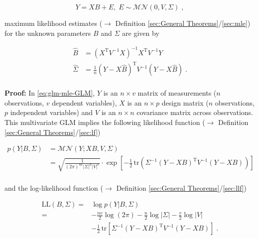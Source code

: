 \documentclass[a4paper,12pt,twoside]{book}
\begin{document}
\begin{equation} \label{eq:glm-mle-GLM}
Y = X B + E, \; E \sim \mathcal{MN}(0, V, \Sigma) \; ,
\end{equation}

maximum likelihood estimates ($\rightarrow$ Definition \ref{sec:General Theorems}/\ref{sec:mle}) for the unknown parameters $B$ and $\Sigma$ are given by

\begin{equation} \label{eq:glm-mle-GLM-MLE}
\begin{split}
\hat{B} &= (X^\mathrm{T} V^{-1} X)^{-1} X^\mathrm{T} V^{-1} Y \\
\hat{\Sigma} &= \frac{1}{n} (Y - X\hat{B})^\mathrm{T} V^{-1} (Y - X\hat{B}) \; . \\
\end{split}
\end{equation}


\vspace{1em}
\textbf{Proof:} In \eqref{eq:glm-mle-GLM}, $Y$ is an $n \times v$ matrix of measurements ($n$ observations, $v$ dependent variables), $X$ is an $n \times p$ design matrix ($n$ observations, $p$ independent variables) and $V$ is an $n \times n$ covariance matrix across observations. This multivariate GLM implies the following likelihood function ($\rightarrow$ Definition \ref{sec:General Theorems}/\ref{sec:lf})

\begin{equation} \label{eq:glm-mle-GLM-LF}
\begin{split}
p(Y|B,\Sigma) &= \mathcal{MN}(Y; XB, V, \Sigma) \\
&= \sqrt{\frac{1}{(2\pi)^{nv} |\Sigma|^n |V|^v}} \cdot \exp\left[ -\frac{1}{2} \, \mathrm{tr}\left( \Sigma^{-1} (Y - XB)^\mathrm{T} V^{-1} (Y - XB) \right)  \right] \\
\end{split}
\end{equation}

and the log-likelihood function ($\rightarrow$ Definition \ref{sec:General Theorems}/\ref{sec:llf})

\begin{equation} \label{eq:glm-mle-GLM-LL1}
\begin{split}
\mathrm{LL}(B,\Sigma) = &\log p(Y|B,\Sigma) \\
= &- \frac{nv}{2} \log(2\pi) - \frac{n}{2} \log |\Sigma| - \frac{v}{2} \log |V| \\
&- \frac{1}{2} \, \mathrm{tr}\left[ \Sigma^{-1} (Y - XB)^\mathrm{T} V^{-1} (Y - XB) \right] \; .\\
\end{split}
\end{equation}
\end{document}

